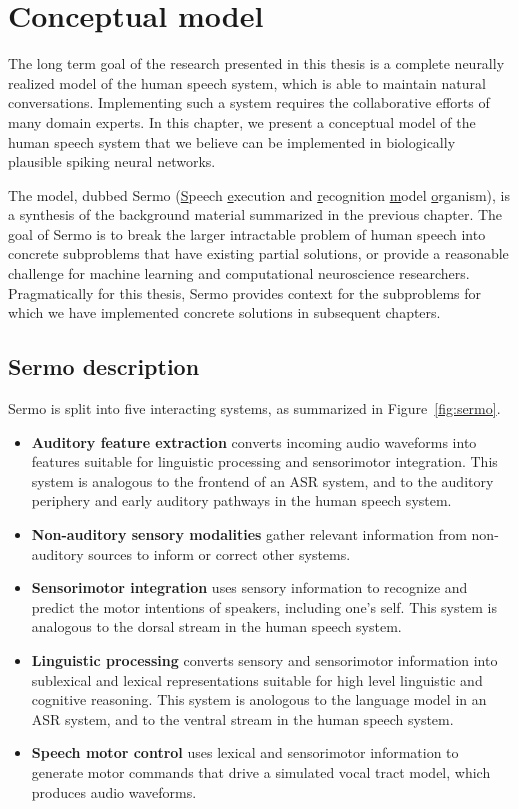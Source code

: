 \chapter{Conceptual model}
\label{chapt:model}

The long term goal of the research
presented in this thesis
is a complete neurally realized model
of the human speech system,
which is able to maintain
natural conversations.
Implementing such a system
requires the collaborative efforts
of many domain experts.
In this chapter, we present
a conceptual model of the human speech system
that we believe can be implemented
in biologically plausible spiking neural networks.

The model, dubbed Sermo
(\underline{S}peech \underline{e}xecution and \underline{r}ecognition
\underline{m}odel \underline{o}rganism),
is a synthesis of the background material
summarized in the previous chapter.
The goal of Sermo
is to break the larger
intractable problem of human speech
into concrete subproblems
that have existing partial solutions,
or provide a reasonable challenge
for machine learning
and computational neuroscience researchers.
Pragmatically for this thesis,
Sermo provides context for
the subproblems for which
we have implemented concrete solutions
in subsequent chapters.

\section{Sermo description}
\label{sec:sermo}


Sermo is split into five interacting systems,
as summarized in Figure~\ref{fig:sermo}.
\begin{itemize}
  \item \textbf{Auditory feature extraction}
    converts incoming audio waveforms into
    features suitable for linguistic processing
    and sensorimotor integration.
    This system is analogous to the frontend
    of an ASR system,
    and to the auditory periphery and
    early auditory pathways in the human speech system.
  \item \textbf{Non-auditory sensory modalities}
    gather relevant information
    from non-auditory sources
    to inform or correct other systems.
  \item \textbf{Sensorimotor integration}
    uses sensory information to
    recognize and predict the motor intentions
    of speakers, including one's self.
    This system is analogous to the
    dorsal stream in the human speech system.
  \item \textbf{Linguistic processing}
    converts sensory and sensorimotor information
    into sublexical and lexical representations
    suitable for high level linguistic
    and cognitive reasoning.
    This system is anologous to
    the language model in an ASR system,
    and to the ventral stream
    in the human speech system.
  \item \textbf{Speech motor control}
    uses lexical and sensorimotor information
    to generate motor commands
    that drive a simulated vocal tract model,
    which produces audio waveforms.
\end{itemize}


